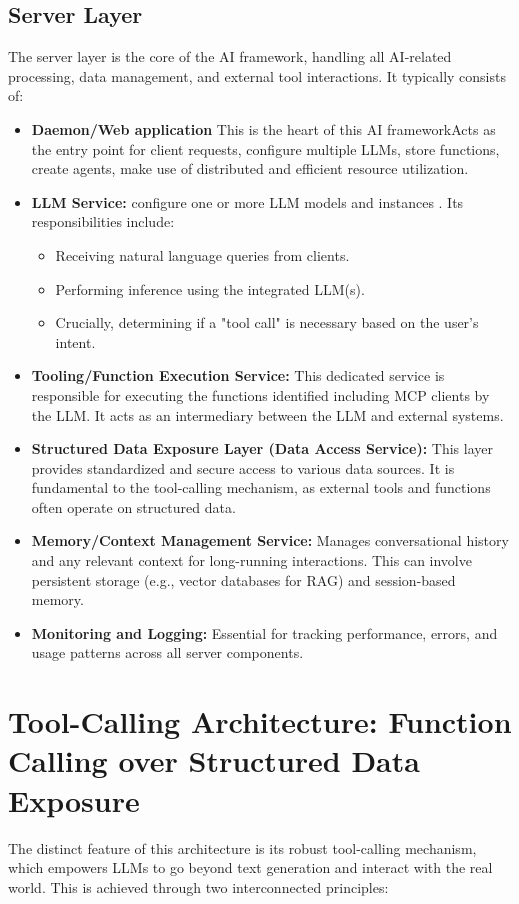 \documentclass[10pt, a4paper]{article}
\begin{document}
\subsection{Server Layer}
The server layer is the core of the AI framework, handling all AI-related processing, data management, and external tool interactions. It typically consists of:
\begin{itemize}
    \item \textbf{Daemon/Web application} This is the heart of this AI frameworkActs as the entry point for client requests, configure multiple LLMs, store functions, create agents, make use of distributed and efficient resource utilization.
    \item \textbf{LLM Service:} configure one or more LLM models and instances . Its responsibilities include:
    \begin{itemize}
        \item Receiving natural language queries from clients.
        \item Performing inference using the integrated LLM(s).
        \item Crucially, determining if a "tool call" is necessary based on the user's intent.
    \end{itemize}
    \item \textbf{Tooling/Function Execution Service:} This dedicated service is responsible for executing the functions identified including MCP clients by the LLM. It acts as an intermediary between the LLM and external systems.
    \item \textbf{Structured Data Exposure Layer (Data Access Service):} This layer provides standardized and secure access to various data sources. It is fundamental to the tool-calling mechanism, as external tools and functions often operate on structured data.
    \item \textbf{Memory/Context Management Service:} Manages conversational history and any relevant context for long-running interactions. This can involve persistent storage (e.g., vector databases for RAG) and session-based memory.
    \item \textbf{Monitoring and Logging:} Essential for tracking performance, errors, and usage patterns across all server components.
\end{itemize}

\section{Tool-Calling Architecture: Function Calling over Structured Data Exposure}
The distinct feature of this architecture is its robust tool-calling mechanism, which empowers LLMs to go beyond text generation and interact with the real world. This is achieved through two interconnected principles:
\end{document}
